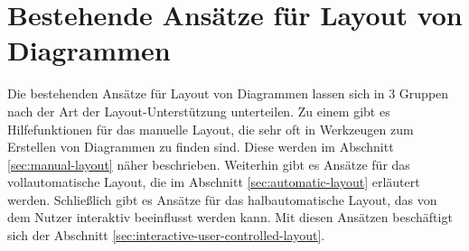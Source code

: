 
\chapter{Bestehende Ansätze für Layout von Diagrammen}

Die bestehenden Ansätze für Layout von Diagrammen lassen sich in 3 Gruppen nach der Art der Layout-Unterstützung unterteilen. Zu einem gibt es Hilfefunktionen für das manuelle Layout, die sehr oft in Werkzeugen zum Erstellen von Diagrammen zu finden sind. Diese werden im Abschnitt \ref{sec:manual-layout} näher beschrieben. Weiterhin gibt es Ansätze für das vollautomatische Layout, die im Abschnitt \ref{sec:automatic-layout} erläutert werden. Schließlich gibt es Ansätze für das halbautomatische Layout, das von dem Nutzer interaktiv beeinflusst werden kann. Mit diesen Ansätzen beschäftigt sich der Abschnitt \ref{sec:interactive-user-controlled-layout}.




